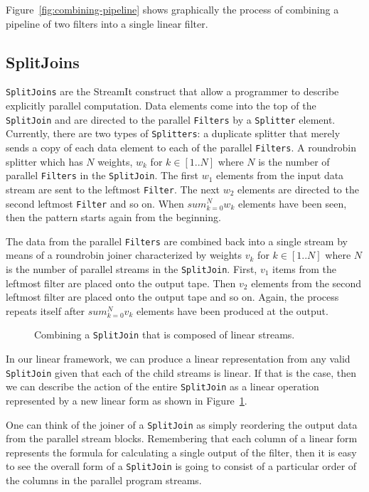 Figure~\ref{fig:combining-pipeline} shows graphically the process of combining
a pipeline of two filters into a single linear filter.

\subsection{SplitJoins}
{\tt SplitJoins} are the StreamIt construct that allow a programmer to describe explicitly 
parallel computation. Data elements come into the top of the {\tt SplitJoin} and are directed
to the parallel {\tt Filters} by a {\tt Splitter} element. Currently, there are two types of
{\tt Splitters}: a duplicate splitter that merely sends a copy of each data element to each
of the parallel {\tt Filters}. A roundrobin splitter which has $N$ weights, $w_k$ for $k\in[1..N]$
where $N$ is the number of parallel {\tt Filters} in the {\tt SplitJoin}. The first $w_1$ elements
from the input data stream are sent to the leftmost {\tt Filter}. The next $w_2$ elements
are directed to the second leftmost {\tt Filter} and so on. When $sum_{k=0}^{N} w_k$ elements
have been seen, then the pattern starts again from the beginning.

The data from the parallel {\tt Filters} are combined back into a single stream by means of
a roundrobin joiner characterized by weights $v_k$ for $k\in[1..N]$ where $N$ is the number
of parallel streams in the {\tt SplitJoin}. First, $v_1$ items from the leftmost filter
are placed onto the output tape. Then $v_2$ elements from the second leftmost filter are placed
onto the output tape and so on. Again, the process repeats itself after $sum_{k=0}^{N} v_k$
elements have been produced at the output.


\begin{figure}
\center
\epsfxsize=3.0in
\caption{Combining a {\tt SplitJoin} that is composed of linear streams.}
\label{fig:splitjoin-combine}
\end{figure}

In our linear framework, we can produce a linear representation from any valid {\tt SplitJoin}
given that each of the child streams is linear. If that is the case, then we can describe the
action of the entire {\tt SplitJoin} as a linear operation represented by a new linear form
as shown in Figure~\ref{fig:splitjoin-combine}.

One can think of the joiner of a {\tt SplitJoin} as simply reordering the output data from
the parallel stream blocks. Remembering that each column of a linear form represents the 
formula for calculating a single output of the filter, then it is easy to see the overall form
of a {\tt SplitJoin} is going to consist of a particular order of the columns in the parallel
program streams.

